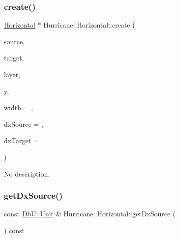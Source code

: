 \subsubsection{\texorpdfstring{create()}{create()}\hspace{0.1cm}{\footnotesize\ttfamily [2/2]}}
{\footnotesize\ttfamily \mbox{\hyperlink{classHurricane_1_1Horizontal}{Horizontal}} $\ast$ Hurricane\+::\+Horizontal\+::create (\begin{DoxyParamCaption}\item[{\mbox{\hyperlink{classHurricane_1_1Component}{Component}} $\ast$}]{source,  }\item[{\mbox{\hyperlink{classHurricane_1_1Component}{Component}} $\ast$}]{target,  }\item[{const \mbox{\hyperlink{classHurricane_1_1Layer}{Layer}} $\ast$}]{layer,  }\item[{const \mbox{\hyperlink{group__DbUGroup_ga4fbfa3e8c89347af76c9628ea06c4146}{Db\+U\+::\+Unit}} \&}]{y,  }\item[{const \mbox{\hyperlink{group__DbUGroup_ga4fbfa3e8c89347af76c9628ea06c4146}{Db\+U\+::\+Unit}} \&}]{width = {},  }\item[{const \mbox{\hyperlink{group__DbUGroup_ga4fbfa3e8c89347af76c9628ea06c4146}{Db\+U\+::\+Unit}} \&}]{dx\+Source = {},  }\item[{const \mbox{\hyperlink{group__DbUGroup_ga4fbfa3e8c89347af76c9628ea06c4146}{Db\+U\+::\+Unit}} \&}]{dx\+Target = {} }\end{DoxyParamCaption})\hspace{0.3cm}{\ttfamily [static]}}

No description. \mbox{\label{classHurricane_1_1Horizontal_a7fdafaa2a7e931413efb2c1fc021f4a8}} 
\subsubsection{\texorpdfstring{get\+Dx\+Source()}{getDxSource()}}
{\footnotesize\ttfamily const \mbox{\hyperlink{group__DbUGroup_ga4fbfa3e8c89347af76c9628ea06c4146}{Db\+U\+::\+Unit}} \& Hurricane\+::\+Horizontal\+::get\+Dx\+Source (\begin{DoxyParamCaption}{ }\end{DoxyParamCaption}) const\hspace{0.3cm}{\ttfamily [inline]}}

